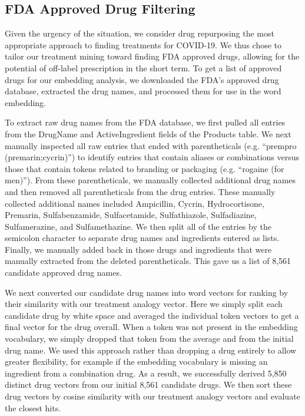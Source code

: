 \documentclass{article}
\begin{document}
\subsection{FDA Approved Drug Filtering}

Given the urgency of the situation, we consider drug repurposing the most appropriate approach to finding treatments for COVID-19.
We thus chose to tailor our treatment mining toward finding FDA approved drugs, allowing for the potential of off-label prescription in the short term.
To get a list of approved drugs for our embedding analysis, we downloaded the FDA's approved drug database\cite{fdadrugs}, extracted the drug names, and processed them for use in the word embedding.

To extract raw drug names from the FDA database, we first pulled all entries from the DrugName and ActiveIngredient fields of the Products table.
We next manually inspected all raw entries that ended with parentheticals (e.g. ``prempro (premarin;cycrin)'') to identify entries that contain aliases or combinations versus those that contain tokens related to branding or packaging (e.g. ``rogaine (for men)'').
From these parentheticals, we manually collected additional drug names and then removed all parentheticals from the drug entries.
These manually collected additional names included Ampicillin, Cycrin, Hydrocortisone, Premarin, Sulfabenzamide, Sulfacetamide, Sulfathiazole, Sulfadiazine, Sulfamerazine, and Sulfamethazine.
We then split all of the entries by the semicolon character to separate drug names and ingredients entered as lists.
Finally, we manually added back in those drugs and ingredients that were manually extracted from the deleted parentheticals.
This gave us a list of 8,561 candidate approved drug names.

We next converted our candidate drug names into word vectors for ranking by their similarity with our treatment analogy vector.
Here we simply split each candidate drug by white space and averaged the individual token vectors to get a final vector for the drug overall.
When a token was not present in the embedding vocabulary, we simply dropped that token from the average and from the initial drug name.
We used this approach rather than dropping a drug entirely to allow greater flexibility, for example if the embedding vocabulary is missing an ingredient from a combination drug.
As a result, we successfully derived 5,850 distinct drug vectors from our initial 8,561 candidate drugs.
We then sort these drug vectors by cosine similarity with our treatment analogy vectors and evaluate the closest hits.
\end{document}
